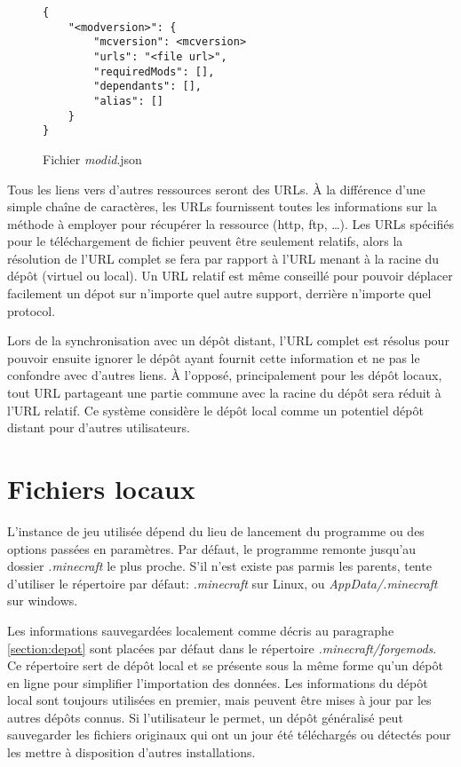 \documentclass{article}
\begin{document}
\begin{figure}
\begin{verbatim}
{
    "<modversion>": {
        "mcversion": <mcversion>
        "urls": "<file url>",
        "requiredMods": [],
        "dependants": [],
        "alias": []
    }
}
\end{verbatim}
\caption{Fichier \textit{modid}.json}
\label{figure:modid.json}
\end{figure}


Tous les liens vers d'autres ressources seront des URLs.
À la différence d'une simple chaîne de caractères, les URLs fournissent toutes les informations sur la méthode à employer pour récupérer la ressource (http, ftp, \dots).
Les URLs spécifiés pour le téléchargement de fichier peuvent être seulement relatifs, alors la résolution de l'URL complet se fera par rapport à l'URL menant à la racine du dépôt (virtuel ou local).
Un URL relatif est même conseillé pour pouvoir déplacer facilement un dépot sur n'importe quel autre support, derrière n'importe quel protocol.

Lors de la synchronisation avec un dépôt distant, l'URL complet est résolus pour pouvoir ensuite ignorer le dépôt ayant fournit cette information et ne pas le confondre avec d'autres liens.
À l'opposé, principalement pour les dépôt locaux, tout URL partageant une partie commune avec la racine du dépôt sera réduit à l'URL relatif.
Ce système considère le dépôt local comme un potentiel dépôt distant pour d'autres utilisateurs.


\section{Fichiers locaux}
L'instance de jeu utilisée dépend du lieu de lancement du programme ou des options passées en paramètres.
Par défaut, le programme remonte jusqu'au dossier \textit{.minecraft} le plus proche.
S'il n'est existe pas parmis les parents, tente d'utiliser le répertoire par défaut: \textit{.minecraft} sur Linux, ou \textit{AppData/.minecraft} sur windows.

Les informations sauvegardées localement comme décris au paragraphe \ref{section:depot} sont placées par défaut dans le répertoire \textit{.minecraft/forgemods}.
Ce répertoire sert de dépôt local et se présente sous la même forme qu'un dépôt en ligne pour simplifier l'importation des données.
Les informations du dépôt local sont toujours utilisées en premier, mais peuvent être mises à jour par les autres dépôts connus.
Si l'utilisateur le permet, un dépôt généralisé peut sauvegarder les fichiers originaux qui ont un jour été téléchargés ou détectés pour les mettre à disposition d'autres installations.
\end{document}
